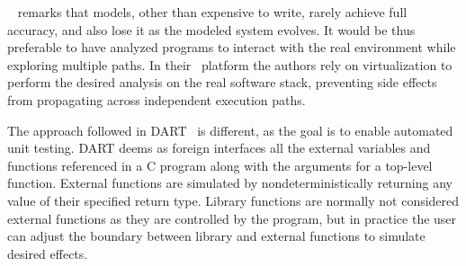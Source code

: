 {\sc \stwoe}~\cite{CKC-TOCS12} remarks that models, other than expensive to write, rarely achieve full accuracy, and also lose it as the modeled system evolves. It would be thus preferable to have analyzed programs to interact with the real environment while exploring multiple paths. In their \stwoe\ platform the authors rely on virtualization to perform the desired analysis on the real software stack, preventing side effects from propagating across independent execution paths. 

The approach followed in {\sc DART}~\cite{DART-PLDI05} is different, as the goal is to enable automated unit testing. DART deems as foreign interfaces all the external variables and functions referenced in a C program along with the arguments for a top-level function.
External functions are simulated by nondeterministically returning any value of their specified return type. Library functions are normally not considered external functions as they are controlled by the program, but in practice the user can adjust the boundary between library and external functions to simulate desired effects.